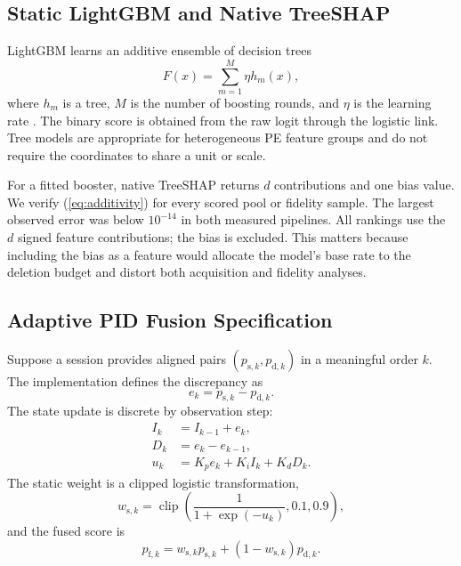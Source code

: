 \subsection{Static LightGBM and Native TreeSHAP}

LightGBM learns an additive ensemble of decision trees
\begin{equation}
F(x)=\sum_{m=1}^{M}\eta h_m(x),
\end{equation}
where $h_m$ is a tree, $M$ is the number of boosting rounds, and $\eta$ is the
learning rate \cite{ke2017lightgbm}. The binary score is obtained from the raw
logit through the logistic link. Tree models are appropriate for heterogeneous
PE feature groups and do not require the coordinates to share a unit or scale.

For a fitted booster, native TreeSHAP returns $d$ contributions and one bias
value. We verify (\ref{eq:additivity}) for every scored pool or fidelity sample.
The largest observed error was below $10^{-14}$ in both measured pipelines. All
rankings use the $d$ signed feature contributions; the bias is excluded. This
matters because including the bias as a feature would allocate the model's base
rate to the deletion budget and distort both acquisition and fidelity analyses.

\subsection{Adaptive PID Fusion Specification}

Suppose a session provides aligned pairs $(p_{\mathrm{s},k},p_{\mathrm{d},k})$ in a meaningful
order $k$. The implementation defines the discrepancy as
\begin{equation}
e_k=p_{\mathrm{s},k}-p_{\mathrm{d},k}.
\label{eq:pid-error}
\end{equation}
The state update is discrete by observation step:
\begin{align}
I_k &= I_{k-1}+e_k,\label{eq:pid-i}\\
D_k &= e_k-e_{k-1},\label{eq:pid-d}\\
u_k &= K_p e_k+K_i I_k+K_d D_k.\label{eq:pid-u}
\end{align}
The static weight is a clipped logistic transformation,
\begin{equation}
w_{\mathrm{s},k}=\operatorname{clip}
\left(\frac{1}{1+\exp(-u_k)},0.1,0.9\right),
\label{eq:pid-weight}
\end{equation}
and the fused score is
\begin{equation}
p_{\mathrm{f},k}=w_{\mathrm{s},k}p_{\mathrm{s},k}+
(1-w_{\mathrm{s},k})p_{\mathrm{d},k}.
\label{eq:fusion}
\end{equation}

